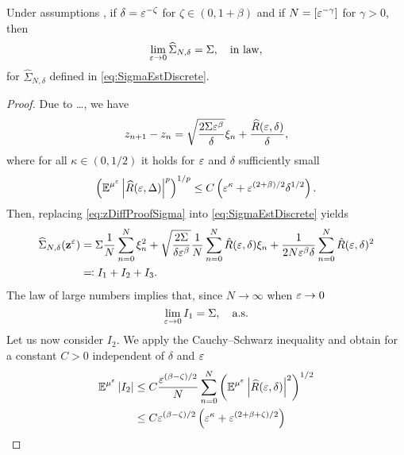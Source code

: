 \documentclass[10pt]{article}
\begin{document}
\begin{theorem}\label{thm:DiffDiscrete} Under assumptions , if $\delta = \varepsilon^{-\zeta}$ for $\zeta \in (0, 1+\beta)$ and if $N = [\varepsilon^{-\gamma}]$ for $\gamma > 0$, then 
	\begin{equation}
	\lim_{\varepsilon \to 0} \widehat \Sigma_{N, \delta} = \Sigma, \quad \text{in law},
	\end{equation}
	for $\widehat \Sigma_{N, \delta}$ defined in \eqref{eq:SigmaEstDiscrete}.
\end{theorem}
\begin{proof} Due to \ldots, we have
	\begin{equation}\label{eq:zDiffProofSigma}
		z_{n+1} - z_n = \sqrt{\frac{2\Sigma\varepsilon^\beta}{\delta}}\xi_n + \frac{\widehat R(\varepsilon, \delta)}{\delta},
	\end{equation}
	where for all $\kappa \in (0, 1/2)$ it holds for $\varepsilon$ and $\delta$ sufficiently small
	\begin{equation}
		\left(\operatorname{\mathbb{E}}^{\mu^\varepsilon}\left\lvert\widehat R(\varepsilon, \Delta)\right\rvert^p\right)^{1/p} \leq C\left(\varepsilon^\kappa + \varepsilon^{(2+\beta)/2}\delta^{1/2}\right).
	\end{equation}
	Then, replacing \eqref{eq:zDiffProofSigma} into \eqref{eq:SigmaEstDiscrete} yields
	\begin{equation}
	\begin{aligned}
		\widehat\Sigma_{N, \delta}(\mathbf z^\varepsilon) &= \Sigma \frac1N \sum_{n=0}^N \xi_n^2 + \sqrt{\frac{2\Sigma}{\delta\varepsilon^\beta}} \frac1N \sum_{n=0}^N \hat R(\varepsilon, \delta)\xi_n
		+ \frac1{2N\varepsilon^\beta\delta}\sum_{n=0}^N\hat R(\varepsilon, \delta)^2\\
		&\eqqcolon I_1 + I_2 + I_3.
	\end{aligned}
	\end{equation}
	The law of large numbers implies that, since $N\to\infty$ when $\varepsilon \to 0$
	\begin{equation}
		\lim_{\varepsilon\to 0}I_1 = \Sigma, \quad \text{a.s.}
	\end{equation}
	Let us now consider $I_2$. We apply the Cauchy--Schwarz inequality and obtain for a constant $C > 0$ independent of $\delta$ and $\varepsilon$
	\begin{equation}
	\begin{aligned}
		\E^{\mu^\epl}\abs{I_2} &\leq C \frac{\epl^{(\beta - \zeta)/2}}{N} \sum_{n=0}^N \left(\E^{\mu^\epl} \abs{\widehat R(\epl, \delta)}^2 \right)^{1/2}\\
		&\leq C \epl^{(\beta - \zeta)/2}\left(\epl^\kappa + \epl^{(2+\beta+\zeta)/2} \right)\\

\end{aligned}
\end{equation}
\end{proof}
\end{document}
